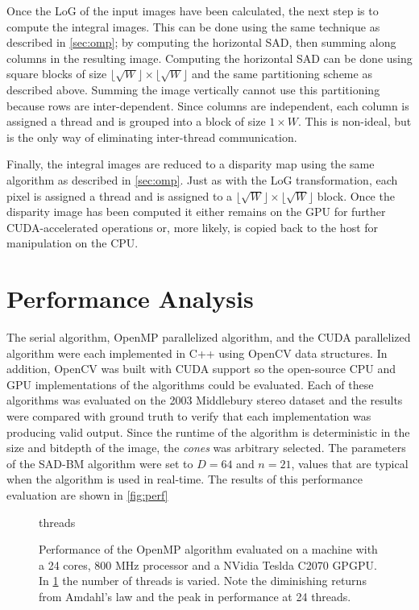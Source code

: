 \documentclass{article}
\let\orgautoref\autoref
\providecommand{\Autoref}
        {\def\equationautorefname{Equation}%
         \def\figureautorefname{Figure}%
         \def\subfigureautorefname{Figure}%
         \def\Itemautorefname{Item}%
         \def\tableautorefname{Table}%
         \def\sectionautorefname{Section}%
         \def\subsectionautorefname{Section}%
         \def\subsubsectionautorefname{Section}%
         \def\chapterautorefname{Section}%
         \def\partautorefname{Part}%
         \orgautoref}
\newcommand{\floor}[1]{\lfloor #1 \rfloor}
\begin{document}
Once the LoG of the input images have been calculated, the next step is to
compute the integral images. This can be done using the same technique as
described in \Autoref{sec:omp}; by computing the horizontal SAD, then summing
along columns in the resulting image. Computing the horizontal SAD can be done
using square blocks of size $\floor{\sqrt{W}} \times \floor{\sqrt{W}}$ and the
same partitioning scheme as described above. Summing the image vertically
cannot use this partitioning because rows are inter-dependent. Since columns
are independent, each column is assigned a thread and is grouped into a block
of size $1 \times W$. This is non-ideal, but is the only way of eliminating
inter-thread communication.

Finally, the integral images are reduced to a disparity map using the same
algorithm as described in \Autoref{sec:omp}. Just as with the LoG
transformation, each pixel is assigned a thread and is assigned to a
$\floor{\sqrt{W}} \times \floor{\sqrt{W}}$ block. Once the disparity image has
been computed it either remains on the GPU for further CUDA-accelerated
operations or, more likely, is copied back to the host for manipulation on the
CPU.

\section{Performance Analysis}
\label{sec:perf}
The serial algorithm, OpenMP parallelized algorithm, and the CUDA parallelized
algorithm were each implemented in C++ using OpenCV data structures. In
addition, OpenCV was built with CUDA support so the open-source CPU and GPU
implementations of the algorithms could be evaluated. Each of these algorithms
was evaluated on the 2003 Middlebury stereo dataset and the results were
compared with ground truth to verify that each implementation was producing
valid output. Since the runtime of the algorithm is deterministic in the size
and bitdepth of the image, the \textit{cones} was arbitrary selected. The
parameters of the SAD-BM algorithm were set to $D = 64$ and $n = 21$, values
that are typical when the algorithm is used in real-time. The results of this
performance evaluation are shown in \Autoref{fig:perf}

\begin{figure}
    \centering
    {threads}
    \caption{
        Performance of the OpenMP algorithm evaluated on a machine with a 24
        cores, 800 MHz processor and a NVidia Teslda C2070 GPGPU. In
        \ref{fig:perf-omp} the number of threads is varied. Note the
        diminishing returns from Amdahl's law and the peak in performance at 24
        threads.
    }
    \label{fig:perf-omp}
\end{figure}
\end{document}
